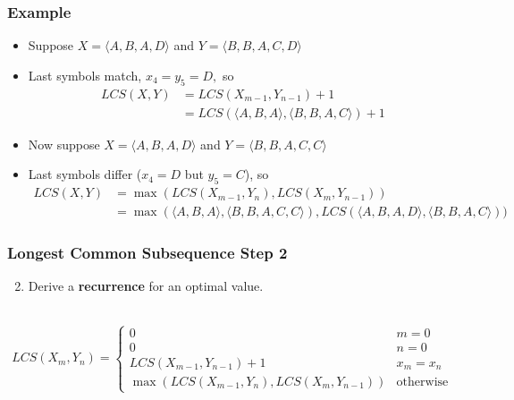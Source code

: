 \documentclass[10pt,aspectratio=169]{beamer}
\newcommand{\stanza}{ \\~\ }
\begin{document}
    \begin{frame} \frametitle{Example}
      \begin{itemize}
        \item Suppose $X=\langle A, B, A, D \rangle$ and $Y = \langle B, B, A, C, D \rangle$
        \item Last symbols match,  $x_4=y_5=D,$ so
          \begin{align*}
            LCS(X,Y) &= LCS(X_{m-1}, Y_{n-1}) + 1 \\
            &= LCS(\langle A, B, A \rangle, \langle B, B, A, C \rangle) + 1
          \end{align*}
        \item Now suppose $X=\langle A, B, A, D \rangle$ and $Y = \langle B, B, A, C, C \rangle$
        \item Last symbols differ ($x_4=D$ but $y_5=C$), so
          {\footnotesize
          \begin{align*}
            LCS(X,Y)
            &= \max(LCS(X_{m-1}, Y_n), LCS(X_m, Y_{n-1})) \\
            &= \max(\langle A, B, A \rangle, \langle B, B, A, C, C \rangle), LCS(\langle A, B, A, D \rangle, \langle B, B, A, C \rangle)) 
          \end{align*}
          }
        \end{itemize}
        
    \end{frame}
    
  \begin{frame} \frametitle{Longest Common Subsequence Step 2}
    \begin{enumerate}
      \setcounter{enumi}{1}
      \item Derive a \textbf{recurrence} for an optimal value.
      \stanza
    \end{enumerate}

\[ LCS(X_m, Y_n) =
    \begin{cases}
      0 & m=0 \\
      0 & n=0 \\
      LCS(X_{m-1}, Y_{n-1}) + 1 & x_m=x_n \\
      \max(LCS(X_{m-1}, Y_n), LCS(X_m, Y_{n-1})) & \text{otherwise}
    \end{cases}
  \]
  \end{frame}
\end{document}
